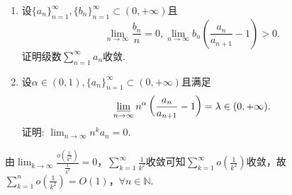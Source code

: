 \documentclass[../../main.tex]{subfiles}%
\begin{document}
\begin{example}
\begin{enumerate}
\item 设$\{a_n\}_{n=1}^\infty,\{b_n\}_{n=1}^\infty\subset(0,+\infty)$且
$$
\lim_{n\to\infty}\frac{b_n}{n}=0,\lim_{n\to\infty}b_n\left(\frac{a_n}{a_{n+1}}-1\right)>0.
$$
证明级数$\sum_{n=1}^\infty a_n$收敛.

\item 设$\alpha\in(0,1),\{a_n\}_{n=1}^\infty\subset(0,+\infty)$且满足
$$
\varliminf_{n\to\infty}n^\alpha\left(\frac{a_n}{a_{n+1}}-1\right)=\lambda\in(0,+\infty).
$$
证明: $\lim_{n\to\infty}n^k a_n=0$.
\end{enumerate}
\end{example}
\begin{remark}
由$\lim_{k\rightarrow \infty}\frac{o\left( \frac{1}{k^2} \right)}{\frac{1}{k^2}}=0$，$\sum_{k=1}^{\infty}{\frac{1}{k^2}}$收敛可知$\sum_{k=1}^{\infty}{o\left( \frac{1}{k^2} \right)}$收敛，故$\sum_{k=1}^n{o\left( \frac{1}{k^2} \right)}=O\left( 1 \right)$，$\forall n\in \mathbb{N}$.
\end{remark}
\end{document}
